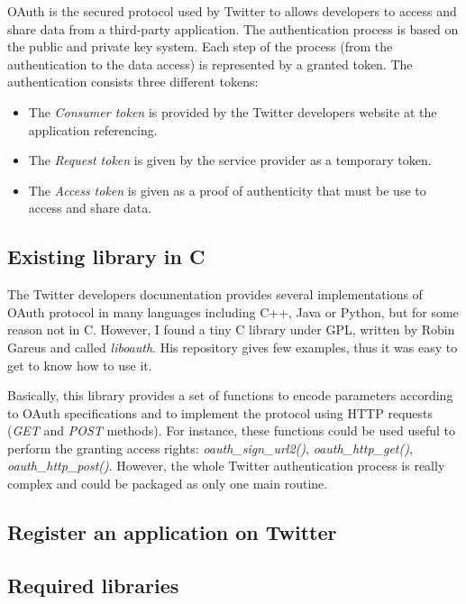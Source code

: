 \clearpage

OAuth is the secured protocol used by Twitter to allows developers to access and share data from a third-party application. The authentication process is based on the public and private key system. Each step of the process (from the authentication to the data access) is represented by a granted token. The authentication consists three different tokens:
\begin{itemize}
\item The \textit{Consumer token} is provided by the Twitter developers website at the application referencing.
\item The \textit{Request token} is given by the service provider as a temporary token.
\item The \textit{Access token} is given as a proof of authenticity that must be use to access and share data.
\end{itemize}


\subsection{Existing library in C}


\hspace{15mm}The Twitter developers documentation provides several implementations of OAuth protocol in many languages including C++, Java or Python, but for some reason not in C. However, I found a tiny C library under GPL, written by Robin Gareus and called \textit{liboauth}. His repository gives few examples, thus it was easy to get to know how to use it.

Basically, this library provides a set of functions to encode parameters according to OAuth specifications and to implement the protocol using HTTP requests (\textit{GET} and \textit{POST} methods). For instance, these functions could be used useful to perform the granting access rights: \textit{oauth\_sign\_url2()}, \textit{oauth\_http\_get()}, \textit{oauth\_http\_post()}. However, the whole Twitter authentication process is really complex and could be packaged as only one main routine.


\subsection{Register an application on Twitter}



\subsection{Required libraries}




\clearpage